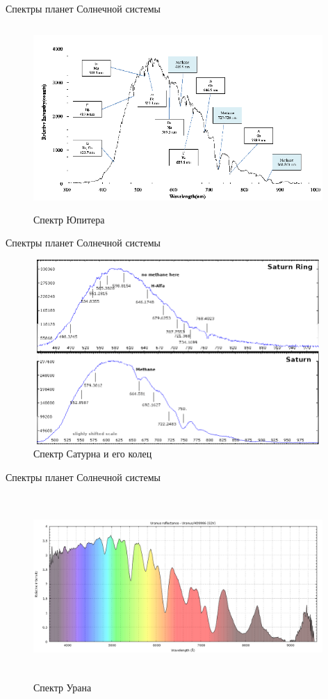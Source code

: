 \documentclass[
]{beamer}
\begin{document}
	\begin{frame}{Спектры планет Солнечной системы}
		\begin{figure}[H]
			\centering
			\includegraphics[width=11cm, height=7cm]{юпитер.png}
			\caption{Спектр Юпитера}
		\end{figure}
	\end{frame}

	\begin{frame}{Спектры планет Солнечной системы}
		\begin{figure}[H]
			\centering
			\includegraphics[width=11cm, height=7cm]{saturn-ring-spec.png}
			\caption{Спектр Сатурна и его колец}
		\end{figure}
	\end{frame}

	\begin{frame}{Спектры планет Солнечной системы}
		\begin{figure}[H]
			\centering
			\includegraphics[width=11cm, height=7cm]{уран.png}
			\caption{Спектр Урана}
		\end{figure}
	\end{frame}
	
\end{document}
